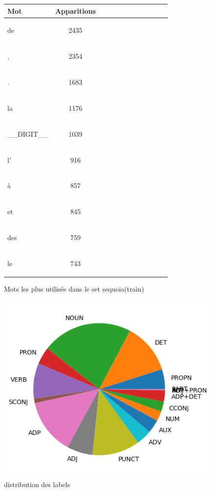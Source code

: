 \begin{figure}[H] \begin{minipage}{0.48\textwidth} \centering \begin{tabular}{|l || *{11 }{|c} |} \hline
Mot & Apparitions  \\ \hline
\begin{verb} de \end{verb} &2435\\ \hline
\begin{verb} , \end{verb} &2354\\ \hline
\begin{verb} . \end{verb} &1683\\ \hline
\begin{verb} la \end{verb} &1176\\ \hline
\begin{verb} __DIGIT__ \end{verb} &1039\\ \hline
\begin{verb} l' \end{verb} &916\\ \hline
\begin{verb} à \end{verb} &857\\ \hline
\begin{verb} et \end{verb} &845\\ \hline
\begin{verb} des \end{verb} &759\\ \hline
\begin{verb} le \end{verb} &743\\ \hline

\end{tabular}
\caption{ Mots les plus utilisés dans le set sequoia(train) } \label{Fig:muw}\end{minipage} 
\begin{minipage}{0.48\textwidth} \centering
\includegraphics[width=.7\linewidth]{sequoiatrain_img.png}
\caption{distribution des labels}
\end{minipage}
\end{figure}


